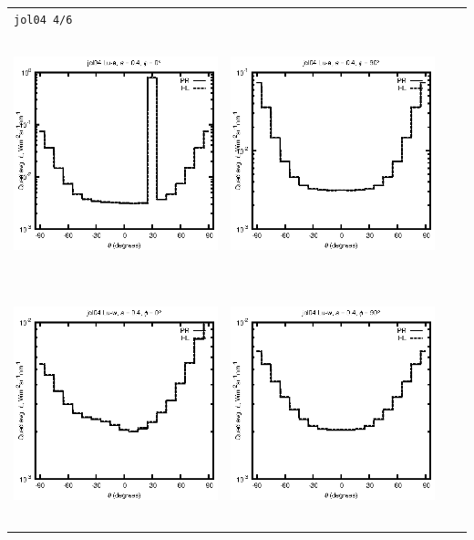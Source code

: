 \begin{tabular}{c c c c}
\multicolumn{4}{l}{\texttt{jol04 4/6}} \\
\includegraphics[height=7cm]{../eps/jol04_Lu_a_fwd.eps} &
\includegraphics[height=7cm]{../eps/jol04_Lu_a_cross.eps}\\
\includegraphics[height=7cm]{../eps/jol04_Lu_w_fwd.eps} &
\includegraphics[height=7cm]{../eps/jol04_Lu_w_cross.eps} \\

\end{tabular}
